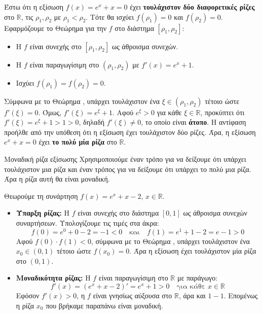 \lysh
Έστω ότι η εξίσωση $f(x) = e^x + x = 0$ έχει \textbf{τουλάχιστον δύο διαφορετικές ρίζες} στο $\mathbb{R}$, τις $\rho_1, \rho_2$ με $\rho_1 < \rho_2$.
Τότε θα ισχύει $f(\rho_1) = 0$ και $f(\rho_2) = 0$.
Εφαρμόζουμε το Θεώρημα  για την $f$ στο διάστημα $[\rho_1, \rho_2]$:
\begin{itemize}
    \item Η $f$ είναι συνεχής στο $[\rho_1, \rho_2]$ ως άθροισμα συνεχών.
    \item Η $f$ είναι παραγωγίσιμη στο $(\rho_1, \rho_2)$ με $f'(x) = e^x + 1$.
    \item Ισχύει $f(\rho_1) = f(\rho_2) = 0$.
\end{itemize}
Σύμφωνα με το Θεώρημα , υπάρχει τουλάχιστον ένα $\xi \in (\rho_1, \rho_2)$ τέτοιο ώστε $f'(\xi) = 0$.
Όμως, $f'(\xi) = e^\xi + 1$. Αφού $e^\xi > 0$ για κάθε $\xi \in \mathbb{R}$, προκύπτει ότι $f'(\xi) = e^\xi + 1 > 1 > 0$, δηλαδή $f'(\xi) \neq 0$, το οποίο είναι \textbf{άτοπο}.
Η αντίφαση προήλθε από την υπόθεση ότι η εξίσωση έχει τουλάχιστον δύο ρίζες.
Άρα, η εξίσωση $e^x + x = 0$ έχει \textbf{το πολύ μία ρίζα} στο $\mathbb{R}$.\\

\begin{askhsh}{Μοναδική ρίζα εξίσωσης}
Χρησιμοποιούμε έναν τρόπο για να δείξουμε ότι υπάρχει τουλάχιστον μια ρίζα και έναν τρόπος για να δείξουμε ότι υπάρχει το πολύ μια ρίζα. Άρα η ρίζα αυτή θα είναι μοναδική.
\end{askhsh}


\lysh
Θεωρούμε τη συνάρτηση $f(x) = e^x + x - 2$, $x \in \mathbb{R}$.
\begin{itemize}
    \item \textbf{Ύπαρξη ρίζας:} Η $f$ είναι συνεχής στο διάστημα $[0, 1]$ ως άθροισμα συνεχών συναρτήσεων. 
    Υπολογίζουμε τις τιμές στα άκρα:
    \[ f(0) = e^0 + 0 - 2 = -1 < 0 \quad \text{και} \quad f(1) = e^1 + 1 - 2 = e - 1 > 0 \]
    Αφού $f(0) \cdot f(1) < 0$, σύμφωνα με το Θεώρημα , υπάρχει τουλάχιστον ένα $x_0 \in (0, 1)$ τέτοιο ώστε $f(x_0) = 0$. Άρα η εξίσωση έχει τουλάχιστον μία ρίζα στο $(0, 1)$.
    \item \textbf{Μοναδικότητα ρίζας:} Η $f$ είναι παραγωγίσιμη στο $\mathbb{R}$ με παράγωγο:
    \[ f'(x) = (e^x + x - 2)' = e^x + 1 > 0 \quad \text{για κάθε } x \in \mathbb{R} \]
    Εφόσον $f'(x) > 0$, η $f$ είναι γνησίως αύξουσα στο $\mathbb{R}$, άρα και $1-1$. Επομένως η ρίζα $x_0$ που βρήκαμε παραπάνω είναι μοναδική.
\end{itemize}

